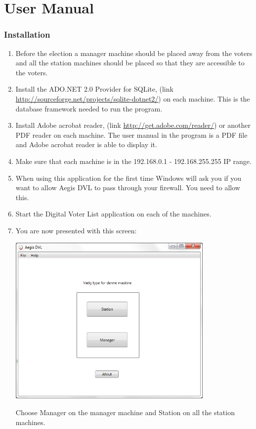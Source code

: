 \documentclass[a4paper]{report}
\begin{document}
\chapter*{User Manual}
\label{sec:uman}
\subsection*{Installation}
\begin{enumerate}
\item Before the election a manager machine should be placed away from the voters and all the station machines should be placed so that they are accessible to the voters.
\item Install the ADO.NET 2.0 Provider for SQLite, (link \url{http://sourceforge.net/projects/sqlite-dotnet2/}) on each machine. This is the database framework needed to run the program.
\item Install Adobe acrobat reader, (link \url{http://get.adobe.com/reader/}) or another PDF reader on each machine. The user manual in the program is a PDF file and Adobe acrobat reader is able to display it.
\item Make sure that each machine is in the 192.168.0.1 - 192.168.255.255 IP range.
\item When using this application for the first time Windows will ask you if you want to allow Aegis DVL to pass through your firewall. You need to allow this.
\item Start the Digital Voter List application on each of the machines.
\item You are now presented with this screen: \\
\begin{center}
\includegraphics[width=100mm]{TypeChoice.png}
\end{center}
Choose Manager on the manager machine and Station on all the station machines.
\end{enumerate}
\end{document}
